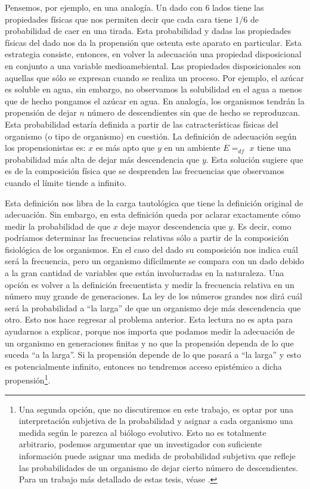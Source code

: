 Pensemos, por ejemplo, en una analogía. Un dado con 6 lados tiene las propiedades físicas que nos permiten decir que cada cara tiene $1/6$  de probabilidad de caer en una tirada. Esta probabilidad y dadas las propiedades físicas del dado nos da la propensión que ostenta este aparato en particular. Esta estrategia consiste, entonces, en volver la adecuación una propiedad disposicional en conjunto a una variable medioamebiental. Las propiedades disposicionales son aquellas que sólo se expresan cuando se realiza un proceso. Por ejemplo, el azúcar es soluble en agua, sin embargo, no observamos la solubilidad en el agua a menos que de hecho pongamos el azúcar en agua. En analogía, los organismos tendrán la propensión de dejar $n$ número de descendientes sin que de hecho se reproduzcan. Esta probabilidad estaría definida a partir de las catracterísticas físicas del organismo (o tipo de organismo) en cuestión. La definición de adecuación según los propensionistas es: $x$ es más apto que $y$ en un ambiente $E =_{df}$ $x$ tiene una probabilidad más alta de dejar más descendencia que $y$. Esta solución sugiere que es de la composición física que se desprenden las frecuencias que observamos cuando el límite tiende a infinito.

Esta definición nos libra de la carga tautológica que tiene la definición original de adecuación. Sin embargo, en esta definición queda por aclarar exactamente cómo medir la probabilidad de que $x$ deje mayor descendencia que $y$. Es decir, como podríamos determinar las frecuencias relativas sólo a partir de la composición fisiológica de los organismos. En el caso del dado su composición nos indica cuál será la frecuencia, pero un organismo difícilmente se compara con un dado debido a la gran cantidad de variables que están involucradas en la naturaleza. Una opción es volver a la definición frecuentista y medir la frecuencia relativa en un número muy grande de generaciones. La ley de los números grandes nos dirá cuál será la probabilidad a ``la larga'' de que un organismo deje más descendencia que otro. Esto nos hace regresar al problema anterior. Esta lectura no es apta para ayudarnos a explicar, porque nos importa que podamos medir la adecuación de un organismo en generaciones finitas y no que la propensión dependa de lo que suceda ``a la larga''. Si la propensión depende de lo que pasará a ``la larga'' y esto es potencialmente infinito, entonces no tendremos acceso epistémico a dicha propensión\footnote{Una segunda opción, que no discutiremos en este trabajo, es optar por una interpretación subjetiva de la probabilidad y asignar a cada organismo una medida según le parezca al biólogo evolutivo. Esto no es totalmente arbitrario, podemos argumentar que un investigador con suficiente información puede asignar una medida de probabilidad subjetiva que refleje las probabilidades de un organismo de dejar cierto número de descendientes. Para un trabajo más detallado de estas tesis, véase \cite{Suarez2021}.}.

